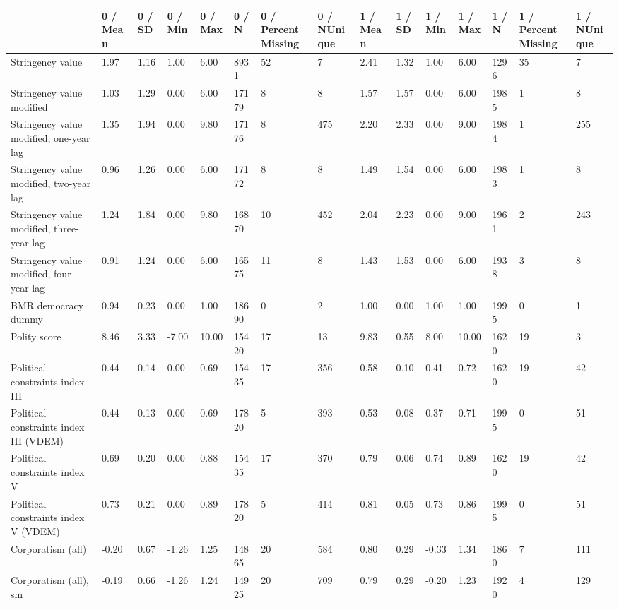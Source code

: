 
\begin{longtable}{lllllllllllllll}
\toprule
  & 0 / Mean & 0 / SD & 0 / Min & 0 / Max & 0 / N & 0 / PercentMissing & 0 / NUnique & 1 / Mean & 1 / SD & 1 / Min & 1 / Max & 1 / N & 1 / PercentMissing & 1 / NUnique\\
\midrule
Stringency value & 1.97 & 1.16 & 1.00 & 6.00 & 8931 & 52 & 7 & 2.41 & 1.32 & 1.00 & 6.00 & 1296 & 35 & 7\\
Stringency value modified & 1.03 & 1.29 & 0.00 & 6.00 & 17179 & 8 & 8 & 1.57 & 1.57 & 0.00 & 6.00 & 1985 & 1 & 8\\
Stringency value modified, one-year lag & 1.35 & 1.94 & 0.00 & 9.80 & 17176 & 8 & 475 & 2.20 & 2.33 & 0.00 & 9.00 & 1984 & 1 & 255\\
Stringency value modified, two-year lag & 0.96 & 1.26 & 0.00 & 6.00 & 17172 & 8 & 8 & 1.49 & 1.54 & 0.00 & 6.00 & 1983 & 1 & 8\\
Stringency value modified, three-year lag & 1.24 & 1.84 & 0.00 & 9.80 & 16870 & 10 & 452 & 2.04 & 2.23 & 0.00 & 9.00 & 1961 & 2 & 243\\
\addlinespace
Stringency value modified, four-year lag & 0.91 & 1.24 & 0.00 & 6.00 & 16575 & 11 & 8 & 1.43 & 1.53 & 0.00 & 6.00 & 1938 & 3 & 8\\
BMR democracy dummy & 0.94 & 0.23 & 0.00 & 1.00 & 18690 & 0 & 2 & 1.00 & 0.00 & 1.00 & 1.00 & 1995 & 0 & 1\\
Polity score & 8.46 & 3.33 & -7.00 & 10.00 & 15420 & 17 & 13 & 9.83 & 0.55 & 8.00 & 10.00 & 1620 & 19 & 3\\
Political constraints index III & 0.44 & 0.14 & 0.00 & 0.69 & 15435 & 17 & 356 & 0.58 & 0.10 & 0.41 & 0.72 & 1620 & 19 & 42\\
Political constraints index III (VDEM) & 0.44 & 0.13 & 0.00 & 0.69 & 17820 & 5 & 393 & 0.53 & 0.08 & 0.37 & 0.71 & 1995 & 0 & 51\\
\addlinespace
Political constraints index V & 0.69 & 0.20 & 0.00 & 0.88 & 15435 & 17 & 370 & 0.79 & 0.06 & 0.74 & 0.89 & 1620 & 19 & 42\\
Political constraints index V (VDEM) & 0.73 & 0.21 & 0.00 & 0.89 & 17820 & 5 & 414 & 0.81 & 0.05 & 0.73 & 0.86 & 1995 & 0 & 51\\
Corporatism (all) & -0.20 & 0.67 & -1.26 & 1.25 & 14865 & 20 & 584 & 0.80 & 0.29 & -0.33 & 1.34 & 1860 & 7 & 111\\
Corporatism (all), sm & -0.19 & 0.66 & -1.26 & 1.24 & 14925 & 20 & 709 & 0.79 & 0.29 & -0.20 & 1.23 & 1920 & 4 & 129\\

\end{longtable}
